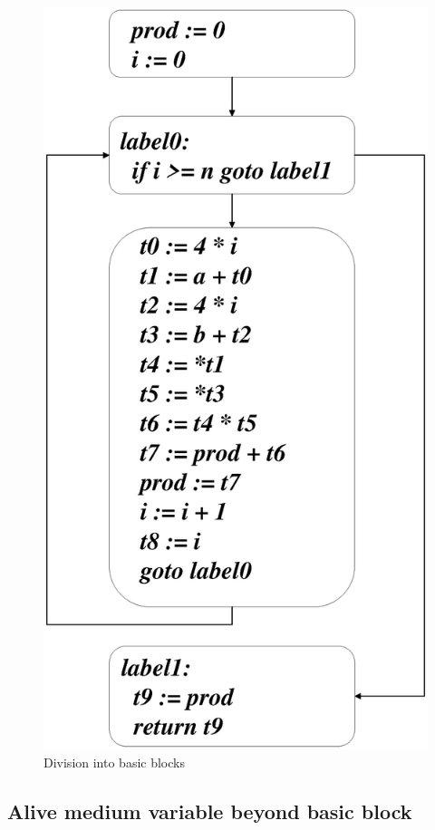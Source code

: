 \begin{figure}[htbp]
\begin{center}
\begin{latexonly}
\includegraphics[width=0.8\linewidth,height=1.436\linewidth]{basic_block.eps}
\end{latexonly}
\caption{Division into basic blocks}
\label{optimize_e000}
\end{center}
\end{figure}

\subsection{Alive medium variable beyond basic block}

